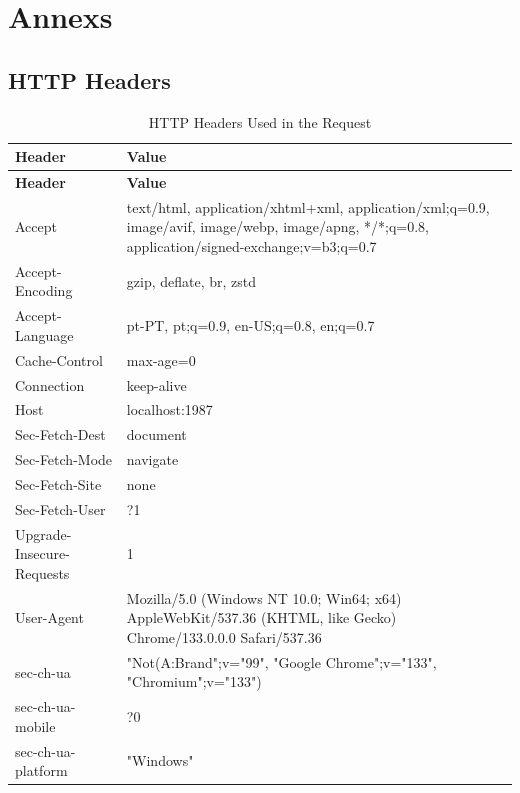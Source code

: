 \chapter{Annexs}\label{chap:annex}

\section{HTTP Headers}

\begin{longtable}{|l|p{12cm}|} 
    \caption{HTTP Headers Used in the Request} \label{tab:headers} \\
    \hline
    \textbf{Header} & \textbf{Value} \\
    \hline
    \endfirsthead

    \hline
    \textbf{Header} & \textbf{Value} \\
    \hline
    \endhead

    \hline
    \endfoot

    \hline
    \endlastfoot

    Accept & text/html, application/xhtml+xml, application/xml;q=0.9, image/avif, image/webp, image/apng, */*;q=0.8, application/signed-exchange;v=b3;q=0.7 \\
    \hline
    Accept-Encoding & gzip, deflate, br, zstd \\
    \hline
    Accept-Language & pt-PT, pt;q=0.9, en-US;q=0.8, en;q=0.7 \\
    \hline
    Cache-Control & max-age=0 \\
    \hline
    Connection & keep-alive \\
    \hline
    Host & localhost:1987 \\
    \hline
    Sec-Fetch-Dest & document \\
    \hline
    Sec-Fetch-Mode & navigate \\
    \hline
    Sec-Fetch-Site & none \\
    \hline
    Sec-Fetch-User & ?1 \\
    \hline
    Upgrade-Insecure-Requests & 1 \\
    \hline
    User-Agent & Mozilla/5.0 (Windows NT 10.0; Win64; x64) AppleWebKit/537.36 (KHTML, like Gecko) Chrome/133.0.0.0 Safari/537.36 \\
    \hline
    sec-ch-ua & "Not(A:Brand";v="99", "Google Chrome";v="133", "Chromium";v="133") \\
    \hline
    sec-ch-ua-mobile & ?0 \\
    \hline
    sec-ch-ua-platform & "Windows" \\
    \hline
\end{longtable}



